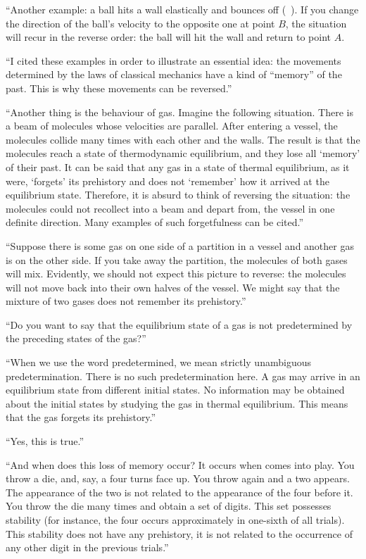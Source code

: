 \begin{dialogue}
\athr ``Another example: a ball hits a wall elastically and bounces
off (~). If you change the direction of the ball's velocity to the opposite one at point $B$, the situation will recur in the reverse order: the ball will hit the wall and return to point $A$.

``I cited these examples in order to illustrate an essential idea: the movements determined by the laws of classical mechanics have a kind of ``memory'' of the past. This is why these movements can be reversed.''

``Another thing is the behaviour of gas. Imagine the following situation. There is a beam of molecules whose velocities are parallel. After entering a vessel, the molecules collide many times with each other and the walls. The result is that the molecules reach a state of thermodynamic equilibrium, and they lose all `memory' of their past. It can be said that any gas in a state of thermal equilibrium, as it were, `forgets' its prehistory and does not `remember' how it arrived at the equilibrium state. Therefore, it is absurd to think of reversing the situation: the molecules could not recollect into a beam and depart from, the vessel in one definite direction. Many examples of such forgetfulness can be cited.''

``Suppose there is some gas on one side of a partition in a vessel and another gas is on the other side. If you take away the partition, the molecules of both gases will mix. Evidently, we should not expect this picture to reverse: the molecules will not move back into their own halves of the vessel. We might say that the mixture of two gases does not remember its prehistory.''

\prtnr ``Do you want to say that the equilibrium state of a gas is not predetermined by the preceding states of the gas?''

\athr ``When we use the word predetermined, we mean strictly unambiguous predetermination. There is no such predetermination here. A gas may arrive in an equilibrium state from different initial states. No information may be obtained about the initial states by studying the gas in thermal equilibrium. This means that the gas forgets its prehistory.''

\prtnr ``Yes, this is true.''

\athr ``And when does this loss of memory occur? It occurs when  comes into play. You throw a die, and, say, a four turns face up. You throw again and a two appears. The appearance of the two is not related to the appearance of the four before it. You throw the die many times and obtain a set of digits. This set possesses stability (for instance, the four occurs approximately in one-sixth of all trials). This stability does not have any prehistory, it is not related to the occurrence of any other digit in the previous trials.''


\end{dialogue}
